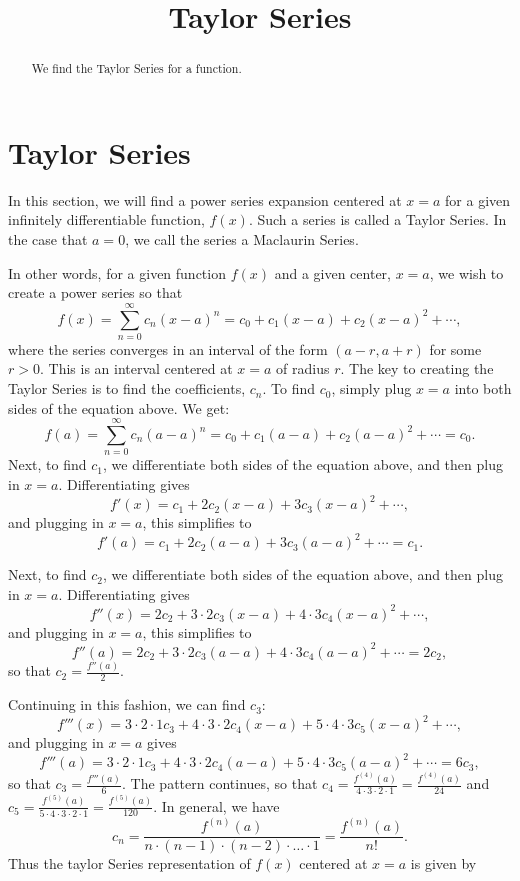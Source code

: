 \documentclass{ximera}
\title{Taylor Series}
\begin{document}
\begin{abstract}
We find the Taylor Series for a function.
\end{abstract}

\maketitle

  
\section{Taylor Series}

In this section, we will find a power series expansion centered at $x = a$ for a given infinitely differentiable function, $f(x)$.
Such a series is called a Taylor Series.  In the case that $a = 0$, we call the series a Maclaurin Series.

In other words, for a given function $f(x)$ and a given center, $x = a$, we wish to create a power series so that
\[
f(x) = \sum_{n=0}^\infty c_n (x-a)^n = c_0 + c_1(x-a) + c_2(x-a)^2 + \cdots,
\]
where the series converges in an interval of the form $(a-r, a+r)$ for some $r >0$. This is an interval centered at $x = a$ of radius $r$.
The key to creating the Taylor Series is to find the coefficients, $c_n$.
To find $c_0$, simply plug $x = a$ into both sides of the equation above. We get:
\[
f(a) = \sum_{n=0}^\infty c_n (a-a)^n = c_0 + c_1(a-a) + c_2(a-a)^2 + \cdots = c_0.
\]
Next, to find $c_1$, we differentiate both sides of the equation above, and then plug in $x = a$.
Differentiating gives
\[
f'(x) = c_1 + 2c_2(x-a) + 3c_3(x-a)^2 + \cdots,
\]
and plugging in $x = a$, this simplifies to 
\[
f'(a) = c_1 + 2c_2(a-a) + 3c_3(a-a)^2 + \cdots = c_1.
\]

Next, to find $c_2$, we differentiate both sides of the equation above, and then plug in $x = a$.
Differentiating gives
\[
f''(x) = 2c_2 + 3\cdot 2 c_3(x-a) + 4\cdot 3 c_4(x-a)^2 + \cdots,
\]
and plugging in $x = a$, this simplifies to 
\[
f''(a) = 2c_2 + 3\cdot 2 c_3(a-a) + 4\cdot 3 c_4(a-a)^2 + \cdots = 2c_2,
\]
so that $c_2 = \frac{f''(a)}{2}$.

Continuing in this fashion, we can find $c_3$:
\[
f'''(x) = 3 \cdot 2 \cdot 1 c_3 + 4\cdot 3 \cdot 2 c_4 (x-a) + 5 \cdot 4 \cdot 3 c_5 (x-a)^2 + \cdots,
\]
and plugging in $x = a$ gives
\[
f'''(a) = 3 \cdot 2 \cdot 1 c_3 + 4\cdot 3 \cdot 2 c_4 (a-a) + 5 \cdot 4 \cdot 3 c_5 (a-a)^2 + \cdots = 6c_3,
\]
so that $c_3 = \frac{f'''(a)}{6}$.
The pattern continues, so that $c_4 = \frac{f^{(4)}(a)}{4\cdot 3 \cdot 2 \cdot 1} = \frac{f^{(4)}(a)}{24}$
and $c_5 = \frac{f^{(5)}(a)}{5\cdot 4 \cdot 3 \cdot 2 \cdot 1} = \frac{f^{(5)}(a)}{120}$.
In general, we have 
\[
c_n = \frac{f^{(n)}(a)}{n\cdot (n-1) \cdot (n-2) \cdot \dots \cdot 1} = \frac{f^{(n)}(a)}{n!}.
\]
Thus the taylor Series representation of $f(x)$ centered at $x = a$ is given by
\end{document}
